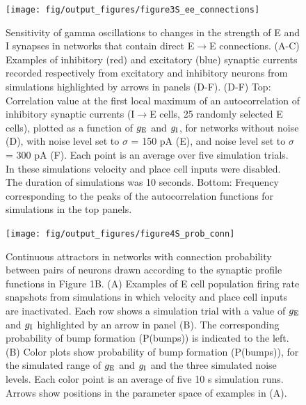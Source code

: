 \documentclass[a4paper,12pt]{article}
\newcommand{\ssc}[3]{\ensuremath{#1_{\text{#2}_{\text{#3}}}}}
\newcommand{\gE      }{\ssc{g}      {\scriptsize{E}}{}}
\newcommand{\gI      }{\ssc{g}      {\scriptsize{I}}{}}
\begin{document}
\begin{figure}[p]
    \internallinenumbers
    \centering
        \texttt{[image: fig/output\_figures/figure3S\_ee\_connections]}
\end{figure}

\clearpage

\begin{figure}[H]
    \internallinenumbers
    \caption{Sensitivity of gamma oscillations to changes in the strength of E
    and I synapses in networks that contain direct E$\rightarrow$E connections.
    (A-C) Examples of inhibitory (red) and excitatory (blue) synaptic currents
    recorded respectively from excitatory and inhibitory neurons from
    simulations highlighted by arrows in panels (D-F).  (D-F) Top: Correlation
    value at the first local maximum of an autocorrelation of inhibitory
    synaptic currents (I$\rightarrow$E cells, 25 randomly selected E cells),
    plotted as a function of $\gE$ and $\gI$, for networks without noise (D), with
    noise level set to $\sigma$ = 150 pA (E), and noise level set to $\sigma$ =
    300 pA (F). Each point is an average over five simulation trials. In these
    simulations velocity and place cell inputs were disabled.  The duration of
    simulations was 10 seconds.  Bottom: Frequency corresponding to the peaks
    of the autocorrelation functions for simulations in the top panels.}
\end{figure}

\clearpage

\setcounter{figure}{0}
\renewcommand{\figurename}{Figure 4 - figure supplement}

\begin{figure}[p]
    \internallinenumbers
    \centering
        \texttt{[image: fig/output\_figures/figure4S\_prob\_conn]}
    \caption{Continuous attractors in networks with connection probability
    between pairs of neurons drawn according to the synaptic profile functions
    in Figure 1B. (A) Examples of E cell population firing rate snapshots from
    simulations in which velocity and place cell inputs are inactivated. Each
    row shows a simulation trial with a value of $\gE$ and $\gI$ highlighted by an
    arrow in panel (B). The corresponding probability of bump formation
    (P(bumps)) is indicated to the left.  (B) Color plots show probability of
    bump formation (P(bumps)), for the simulated range of $\gE$ and $\gI$ and the
    three simulated noise levels. Each color point is an average of five 10 s
    simulation runs. Arrows show positions in the parameter space of examples
    in (A).}
\end{figure}
\end{document}

